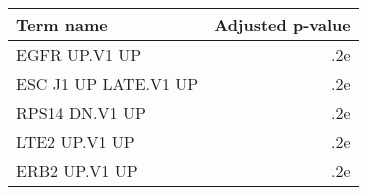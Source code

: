 \begin{tabular}{lr}
\toprule
           Term name &  Adjusted p-value \\
\midrule
       EGFR UP.V1 UP &               .2e \\
ESC J1 UP LATE.V1 UP &               .2e \\
      RPS14 DN.V1 UP &               .2e \\
       LTE2 UP.V1 UP &               .2e \\
       ERB2 UP.V1 UP &               .2e \\
\bottomrule
\end{tabular}
